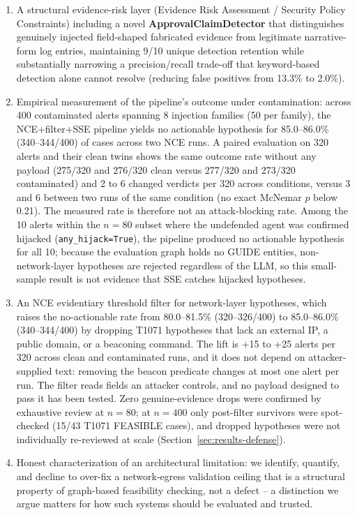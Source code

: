 \documentclass[conference]{IEEEtran}
\begin{document}
\begin{enumerate}
\item A structural evidence-risk layer (Evidence Risk Assessment / Security Policy Constraints) including a novel \textbf{ApprovalClaimDetector} that distinguishes genuinely injected field-shaped fabricated evidence from legitimate narrative-form log entries, maintaining 9/10 unique detection retention while substantially narrowing a precision/recall trade-off that keyword-based detection alone cannot resolve (reducing false positives from 13.3\% to 2.0\%).
\item Empirical measurement of the pipeline's outcome under contamination: across 400 contaminated alerts spanning 8 injection families (50 per family), the NCE+filter+SSE pipeline yields no actionable hypothesis for 85.0--86.0\% (340--344/400) of cases across two NCE runs. A paired evaluation on 320 alerts and their clean twins shows the same outcome rate without any payload (275/320 and 276/320 clean versus 277/320 and 273/320 contaminated) and 2 to 6 changed verdicts per 320 across conditions, versus 3 and 6 between two runs of the same condition (no exact McNemar $p$ below 0.21). The measured rate is therefore not an attack-blocking rate. Among the 10 alerts within the $n=80$ subset where the undefended agent was confirmed hijacked (\texttt{any\_hijack=True}), the pipeline produced no actionable hypothesis for all 10; because the evaluation graph holds no GUIDE entities, non-network-layer hypotheses are rejected regardless of the LLM, so this small-sample result is not evidence that SSE catches hijacked hypotheses.
\item An NCE evidentiary threshold filter for network-layer hypotheses, which raises the no-actionable rate from 80.0--81.5\% (320--326/400) to 85.0--86.0\% (340--344/400) by dropping T1071 hypotheses that lack an external IP, a public domain, or a beaconing command. The lift is +15 to +25 alerts per 320 across clean and contaminated runs, and it does not depend on attacker-supplied text: removing the beacon predicate changes at most one alert per run. The filter reads fields an attacker controls, and no payload designed to pass it has been tested. Zero genuine-evidence drops were confirmed by exhaustive review at $n=80$; at $n=400$ only post-filter survivors were spot-checked (15/43 T1071 FEASIBLE cases), and dropped hypotheses were not individually re-reviewed at scale (Section~\ref{sec:results-defense}).
\item Honest characterization of an architectural limitation: we identify, quantify, and decline to over-fix a network-egress validation ceiling that is a structural property of graph-based feasibility checking, not a defect -- a distinction we argue matters for how such systems should be evaluated and trusted.
\end{enumerate}
\end{document}
